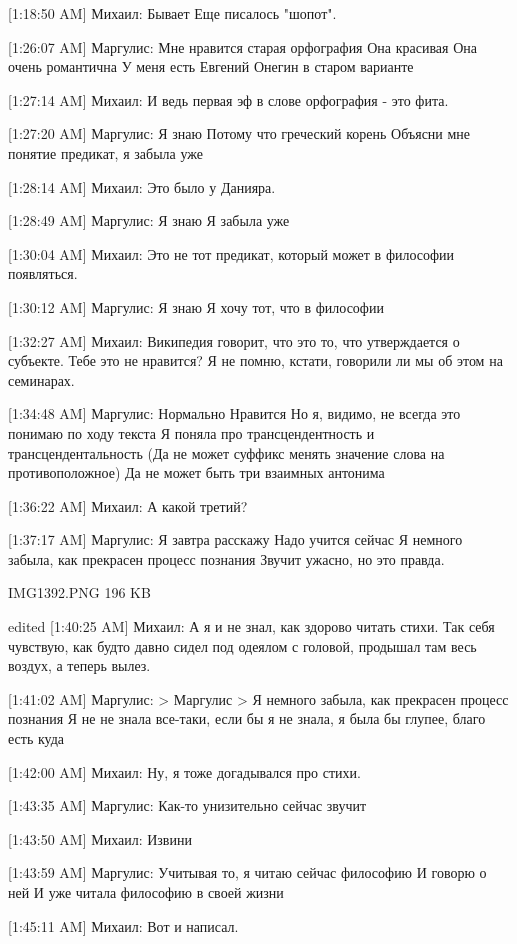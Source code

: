 \documentclass{article}
\begin{document}
[1:18:50 AM] Михаил:
Бывает
 Еще писалось "шопот".

[1:26:07 AM] Маргулис:
Мне нравится старая орфография
 Она красивая
 Она очень романтична
 У меня есть Евгений Онегин в старом варианте

[1:27:14 AM] Михаил:
И ведь первая эф в слове орфография - это фита.

[1:27:20 AM] Маргулис:
Я знаю
 Потому что греческий корень
 Объясни мне понятие предикат, я забыла уже

[1:28:14 AM] Михаил:
Это было у Данияра.

[1:28:49 AM] Маргулис:
Я знаю
 Я забыла уже

[1:30:04 AM] Михаил:
Это не тот предикат, который может в философии появляться.

[1:30:12 AM] Маргулис:
Я знаю
 Я хочу тот, что в философии

[1:32:27 AM] Михаил:
Википедия говорит, что это то, что утверждается о субъекте.
 Тебе это не нравится?
 Я не помню, кстати, говорили ли мы об этом на семинарах.

[1:34:48 AM] Маргулис:
Нормально
 Нравится
 Но я, видимо, не всегда это понимаю по ходу текста
 Я поняла про трансцендентность и трансцендентальность
 (Да не может суффикс менять значение слова на противоположное)
 Да не может быть три взаимных антонима

[1:36:22 AM] Михаил:
А какой третий?

[1:37:17 AM] Маргулис:
Я завтра расскажу
 Надо учится сейчас
 Я немного забыла, как прекрасен процесс познания
 Звучит ужасно, но это правда.
 
IMG1392.PNG 196 KB
 
edited 
[1:40:25 AM] Михаил:
А я и не знал, как здорово читать стихи. Так себя чувствую, как будто давно сидел под одеялом с головой, продышал там весь воздух, а теперь вылез.

[1:41:02 AM] Маргулис:
> Маргулис
> Я немного забыла, как прекрасен процесс познания
Я не не знала все-таки, если бы я не знала, я была бы глупее, благо есть куда

[1:42:00 AM] Михаил:
Ну, я тоже догадывался про стихи.

[1:43:35 AM] Маргулис:
Как-то унизительно сейчас звучит

[1:43:50 AM] Михаил:
Извини

[1:43:59 AM] Маргулис:
Учитывая то, я читаю сейчас философию
 И говорю о ней
 И уже читала философию в своей жизни

[1:45:11 AM] Михаил:
Вот и написал.
\end{document}
